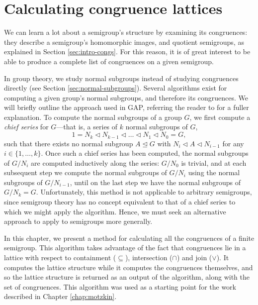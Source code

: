 \chapter{Calculating congruence lattices}
\label{chap:lattice}

We can learn a lot about a semigroup's structure by examining its congruences:
they describe a semigroup's homomorphic images, and quotient semigroups, as
explained in Section \ref{sec:intro-congs}.  For this reason, it is of great
interest to be able to produce a complete list of congruences on a given
semigroup.

In group theory, we study normal subgroups instead of studying congruences
directly (see Section \ref{sec:normal-subgroups}).  Several algorithms exist for
computing a given group's normal subgroups, and therefore its congruences.  We
will briefly outline the approach used in GAP, referring the reader to
\cite{hulpke_1998} for a fuller explanation.  To compute the normal subgroups of
a group $G$, we first compute a \textit{chief series} for $G$---that is, a
series of $k$ normal subgroups of $G$,
$$1 = N_k
\triangleleft N_{k-1}
\triangleleft \ldots
\triangleleft N_1
\triangleleft N_0 = G,$$
such that there exists no normal subgroup $A \trianglelefteq G$ with
$N_i \triangleleft A \triangleleft N_{i-1}$ for any $i \in \{1, \ldots, k\}$.
Once such a chief series has been computed, the normal subgroups of $G / N_i$
are computed inductively along the series: $G / N_0$ is trivial, and at each
subsequent step we compute the normal subgroups of $G / N_i$ using the normal
subgroups of $G / N_{i-1}$, until on the last step we have the normal subgroups
of $G / N_k = G$.  Unfortunately, this method is not applicable to arbitrary
semigroups, since semigroup theory has no concept equivalent to that of a chief
series to which we might apply the algorithm.  Hence, we must seek an
alternative approach to apply to semigroups more generally.

In this chapter, we present a method for calculating all the congruences of a
finite semigroup.  This algorithm takes advantage of the fact that congruences
lie in a lattice with respect to containment ($\subseteq$), intersection
($\cap$) and join ($\vee$).  It computes the lattice structure while it computes
the congruences themselves, and so the lattice structure is returned as an
output of the algorithm, along with the set of congruences.  This algorithm was
used as a starting point for the work described in Chapter \ref{chap:motzkin}.

